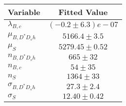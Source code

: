 \begin{tabular}[t]{lc}
\hline
Variable &Fitted Value\\
\hline\hline
$\lambda_{B,c}$&$(-0.2\pm6.3)e-07$\\
\hline
$\mu_{B, D^* D_s h}$&$5166.4\pm3.5$\\
\hline
$\mu_S$&$5279.45\pm0.52$\\
\hline
$n_{B, D^* D_s h}$&$665\pm32$\\
\hline
$n_{B,c}$&$54\pm35$\\
\hline
$n_S$&$1364\pm33$\\
\hline
$\sigma_{B, D^* D_s h}$&$27.3\pm2.4$\\
\hline
$\sigma_S$&$12.40\pm0.42$\\
\hline
\end{tabular}